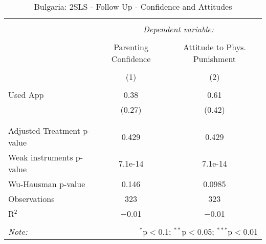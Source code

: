 
\begin{table}[!htbp] \centering 
  \caption{Bulgaria: 2SLS - Follow Up - Confidence and Attitudes} 
  \label{tbl:Bulgaria: 2SLS - Follow Up - Confidence and Attitudes} 
\begin{tabular}{@{\extracolsep{5pt}}lcc} 
\\[-1.8ex]\hline 
\hline \\[-1.8ex] 
 & \multicolumn{2}{c}{\textit{Dependent variable:}} \\ 
\cline{2-3} 
\\[-1.8ex] & Parenting Confidence & Attitude to Phys. Punishment \\ 
\\[-1.8ex] & (1) & (2)\\ 
\hline \\[-1.8ex] 
 Used App & 0.38 & 0.61 \\ 
  & (0.27) & (0.42) \\ 
  & & \\ 
\hline \\[-1.8ex] 
Adjusted Treatment p-value & 0.429 & 0.429 \\ 
Weak instruments p-value & 7.1e-14 & 7.1e-14 \\ 
Wu-Hausman p-value & 0.146 & 0.0985 \\ 
Observations & 323 & 323 \\ 
R$^{2}$ & $-$0.01 & $-$0.01 \\ 
\hline 
\hline \\[-1.8ex] 
\textit{Note:}  & \multicolumn{2}{r}{$^{*}$p$<$0.1; $^{**}$p$<$0.05; $^{***}$p$<$0.01} \\ 
\end{tabular} 
\end{table} 
